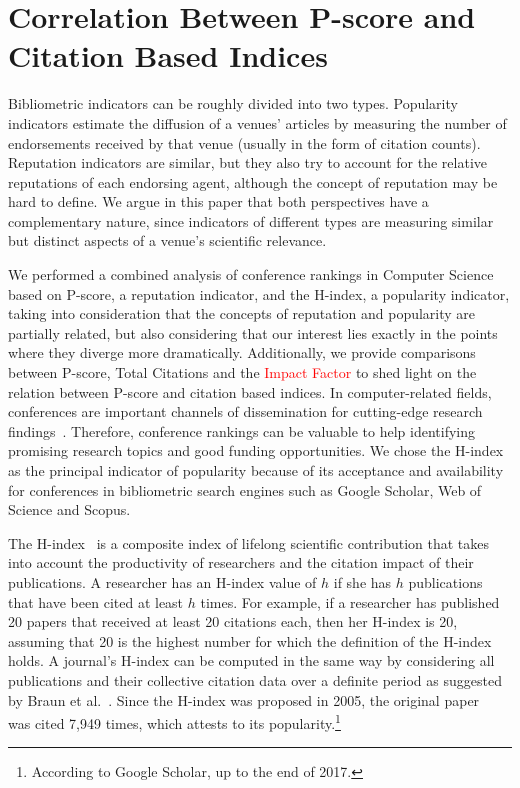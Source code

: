 \documentclass[notitlepage]{svjour3}
\begin{document}
\section{Correlation Between P-score and Citation Based Indices} 
\label{sec:correlation}

Bibliometric indicators can be roughly divided into two types. Popularity indicators 
estimate the diffusion of a venues' articles by measuring the number of
endorsements received by that venue (usually in the form of citation counts). Reputation
indicators are similar, but they also try to account for the relative reputations of each
endorsing agent, although the concept of reputation may be hard to define.
We argue in this paper that both perspectives have a complementary nature,
since indicators of different types are measuring similar but distinct aspects of
a venue's scientific relevance. 

We performed a combined analysis of conference rankings in Computer Science based on 
P-score, a reputation indicator, and the H-index, a popularity indicator, 
taking into consideration that the concepts of reputation and popularity are
partially related, but also considering that our interest lies exactly in the points
where they diverge more dramatically. Additionally, 
we provide comparisons between P-score, Total Citations and the \textcolor{red}{Impact Factor}
to shed light on the relation between P-score and citation based indices.
In computer-related fields, conferences are important channels of dissemination for cutting-edge
research findings~\cite{Lee2019}. Therefore, conference rankings can be valuable to help
identifying promising research topics and good funding opportunities. 
We chose the H-index as the principal indicator of popularity because of its acceptance 
and availability for conferences in bibliometric search engines such as Google Scholar, 
Web of Science and Scopus. 

The H-index~\cite{Hirsch2005} is a composite index of lifelong scientific contribution that takes 
into account the productivity of researchers and the citation impact of their publications.
A researcher has an H-index value of $ h $ if she has $ h $ publications that have been cited at 
least $ h $ times. For example, if a researcher has published 20 papers that received at least 20 
citations each, then her H-index is 20, assuming that 20 is the highest number for which the 
definition of the H-index holds. A journal's H-index can be computed 
in the same way by considering all publications and their collective citation data over a 
definite period as suggested by Braun et al.~\cite{Braun2006}.
Since the H-index was proposed in 2005, the original paper~\cite{Hirsch2005} was 
cited 7,949 times, which attests to its popularity.\footnote{According to Google Scholar, up to the end of 2017.}
\end{document}
